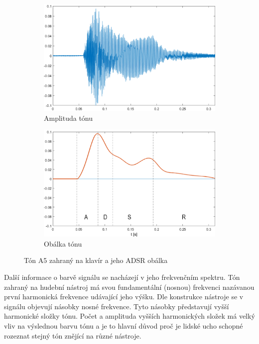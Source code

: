   \begin{figure}[H]
    \centering
    \begin{subfigure}[b]{0.8\linewidth}
        \includegraphics[width = \linewidth]{obrazky/Piano_tone_waveform.png}
        \caption{Amplituda tónu}
    \end{subfigure}
    \begin{subfigure}[b]{0.8\linewidth}
        \includegraphics[width = \linewidth]{obrazky/Piano_tone_obalka.png}
        \caption{Obálka tónu}
    \end{subfigure}
    \caption{Tón A5 zahraný na klavír a jeho ADSR obálka}
    \label{fig:ADSR_envelope_on_piano_tone}
  \end{figure}

  Další informace o barvě signálu se nacházejí v jeho frekvenčním spektru. 
  Tón zahraný na hudební nástroj má svou fundamentální (nosnou) frekvenci nazávanou první harmonická frekvence udávající jeho výšku.
  Dle konstrukce nástroje se v signálu objevují násobky nosné frekvence.
  Tyto násobky představují vyšší harmonické složky tónu.
  Počet a amplituda vyšších harmonických složek má velký vliv na výslednou barvu tónu a je to hlavní důvod proč je lidské ucho schopné rozeznat stejný tón znějící na různé nástroje.

